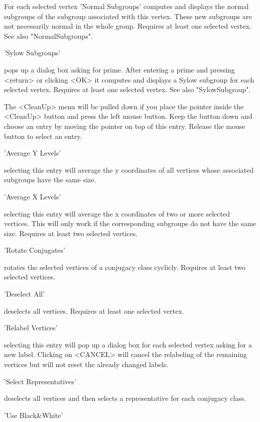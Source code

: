 For   each selected vertex 'Normal  Subgroups'  computes and displays the
normal subgroups of the subgroup associated  with this vertex.  These new
subgroups are not  necessarily  normal in the  whole  group.  Requires at
least one selected vertex.  See also "NormalSubgroups".

'Sylow Subgroups'

pops  up a dialog  box asking   for prime.   After entering  a  prime and
pressing  <return> or  clicking  <OK> it computes   and displays  a Sylow
subgroup  for   each selected vertex.  Requires   at   least one selected
vertex.  See also "SylowSubgroup".


The  <CleanUp> menu will  be pulled down if you  place the pointer inside
the <CleanUp> button and press  the left mouse  button.  Keep the  button
down and  choose an entry   by moving the pointer on   top of this entry.
Release the mouse button to select an entry.

'Average Y Levels'

selecting this entry will average the y coordinates of all vertices whose
associated subgroups have the same size.

'Average X Levels'

selecting this entry  will  average the x   coordinates  of two or   more
selected vertices.  This will only work if the corresponding subgroups do
not have the same size. Requires at least two selected vertices.

'Rotate Conjugates'

rotates the selected vertices of a conjugacy class cyclicly.  Requires at
least two selected vertices.

'Deselect All'

deselects all vertices.  Requires at least one selected vertex.

'Relabel Vertices'

selecting  this entry will pop  up a dialog  box for each selected vertex
asking for a new label.  Clicking on <CANCEL>  will cancel the relabeling
of the remaining vertices but will not reset the already changed labels.

'Select Representatives'

deselects  all vertices    and  then selects a   representative  for each
conjugacy class.

'Use Black\&White'


